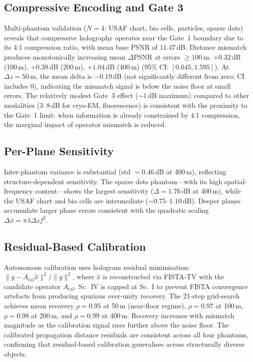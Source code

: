\documentclass[11pt]{article}
\begin{document}
\subsection{Compressive Encoding and Gate 3}
Multi-phantom validation ($N{=}4$: USAF chart, bio cells, particles, sparse dots) reveals that compressive holography operates near the Gate~1 boundary due to its 4:1 compression ratio, with mean base PSNR of $11.47$\,dB.
Distance mismatch produces monotonically increasing mean $\Delta$PSNR at errors $\geq 100$\,\textmu m: $+0.32$\,dB (100\,\textmu m), $+0.38$\,dB (200\,\textmu m), $+1.04$\,dB (400\,\textmu m) (95\% CI: $[0.645, 1.595]$).
At $\Delta z{=}50$\,\textmu m, the mean delta is $-0.19$\,dB (not significantly different from zero; CI includes 0), indicating the mismatch signal is below the noise floor at small errors.
The relatively modest Gate~3 effect (${\sim}1$\,dB maximum) compared to other modalities ($3$--$8$\,dB for cryo-EM, fluorescence) is consistent with the proximity to the Gate~1 limit: when information is already constrained by 4:1 compression, the marginal impact of operator mismatch is reduced.

\subsection{Per-Plane Sensitivity}
Inter-phantom variance is substantial (std $= 0.46$\,dB at 400\,\textmu m), reflecting structure-dependent sensitivity. The sparse dots phantom---with its high spatial-frequency content---shows the largest sensitivity ($\Delta{=}1.76$\,dB at 400\,\textmu m), while the USAF chart and bio cells are intermediate (${\sim}0.75$--$1.10$\,dB). Deeper planes accumulate larger phase errors consistent with the quadratic scaling $\Delta\phi = \pi\lambda\Delta z f^2$.

\subsection{Residual-Based Calibration}
Autonomous calibration uses hologram residual minimisation: $\|y - A_{\mathrm{cal}}\hat{x}\|^2 / \|y\|^2$, where $\hat{x}$ is reconstructed via FISTA-TV with the candidate operator $A_{\mathrm{cal}}$. Sc.~IV is capped at Sc.~I to prevent FISTA convergence artefacts from producing spurious over-unity recovery. The 21-step grid-search achieves mean recovery $\rho = 0.95$ at 50\,\textmu m (near-floor regime), $\rho = 0.97$ at 100\,\textmu m, $\rho = 0.98$ at 200\,\textmu m, and $\rho = 0.99$ at 400\,\textmu m. Recovery increases with mismatch magnitude as the calibration signal rises further above the noise floor. The calibrated propagation distance residuals are consistent across all four phantoms, confirming that residual-based calibration generalises across structurally diverse objects.
\end{document}
